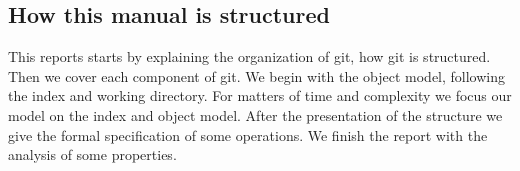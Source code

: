 \subsection{How this manual is structured}
This reports starts by explaining the organization of git, how git is
structured. Then we cover each component of git. We begin with the
object model, following the index and working directory. For matters
of time and complexity we focus our model on the index and object
model. After the presentation of the structure we give the formal
specification of some operations. We finish the report with the
analysis of some properties.


